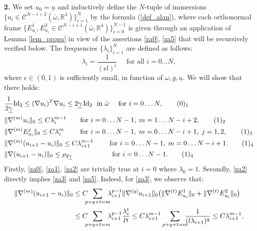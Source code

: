 \documentclass[reqno,twoside,11pt]{amsart}
\newcommand{\Id}{\mathrm{Id}}
\newcommand{\R}{\mathbb{R}}
\numberwithin{equation}{section}
\theoremstyle{plain}
\theoremstyle{definition}
\begin{document}
{\bf 2.} We set $u_0=\underline u$ and  inductively define the $N$-tuple of
immersions $\{u_i\in\mathcal{C}^{N-i+2}(\bar\omega, \R^4)\}_{i=1}^N$
by the formula (\ref{def_alan}), where each orthonormal frame $\{E^1_{u_i},
E^2_{u_i}\in\mathcal{C}^{N-i+1}(\bar\omega, \R^4)\}_{i=0}^{N-1}$ is
given through an application of Lemma \ref{lem_propa} in view of the
assertions \ref{za0}, \ref{za5} that will be recursively verified
below. The frequencies $\{\lambda_i\}_{i=1}^N$ are defined as follows:
\begin{equation}\label{b2}
\lambda_i = \frac{1}{(\epsilon l)^i} \quad \mbox{ for all } i=0\ldots N, 
\end{equation}
where $\epsilon\in (0,1)$ is sufficiently small, in function of $\omega, g, \underline u$.
We will show that there holds:
\begin{align*}
& \frac{1}{2\underline\gamma}\Id_2\leq (\nabla u_i)^T\nabla 
u_i\leq 2\underline \gamma \,\Id_2
\; \mbox{ in } \bar\omega\quad \mbox{ for  } i=0\ldots N,
\tag*{(\theequation)$_1$}\refstepcounter{equation} \label{za0} \\
& \|\nabla^{(m)}u_i\|_0\leq C\lambda_i^{m-1}\quad 
\quad \mbox{for } i=0\ldots N-1,\; m=1\ldots N-i+2, \tag*{(\theequation)$_2$} \label{za1}\\
& \|\nabla^{(m)}E_{u_i}^j\|_0\leq C\lambda_i^{m}\quad 
\quad \mbox{ for } i=0\ldots N-1,\; m=0\ldots N-i+1,\; j=1,2, \tag*{(\theequation)$_3$} \label{za2}\\
& \|\nabla^{(m)}(u_{i+1}-u_i)\|_0\leq C\lambda_{i+1}^{m-1}\qquad 
\mbox{ for } i=0\ldots N-1,\; m=0\ldots N-i+1. \tag*{(\theequation)$_4$} \label{za3}\\
& \|\nabla(u_{i+1}-u_i)\|_0\leq \rho_{2\underline\gamma}\hspace{2.05cm}
\mbox{for } i=0\ldots N-1.\tag*{(\theequation)$_4$} \label{za5}
\end{align*}
Firstly, \ref{za0}, \ref{za1}, \ref{za2} are trivially true at $i=0$ where
$\lambda_0=1$. Secondly, \ref{za2} directly implies \ref{za3} and
\ref{za5}. Indeed, for \ref{za3}, we observe that:
\begin{equation*}
\begin{split}
\|\nabla^{(m)}(u_{i+1}-u_i)\|_0 &\leq C \hspace{-2mm}\sum_{p+q+t=m}
\hspace{-2mm} \lambda_{i+1}^{p-1}\|\nabla^{(q)}a_{i+1}\|_0
\big(\|\nabla^{(t)}E_{u_i}^1\|_0+\|\nabla^{(t)}E_{u_i}^2\|_0\big) 
\\ & \leq C \hspace{-2mm}\sum_{p+q+t=m}
\hspace{-2mm} \lambda_{i+1}^{p-1}\frac{\lambda_i^t}{l^q}
\leq  C\lambda_{i+1}^{m-1} \sum_{p+q+t=m}
\hspace{-2mm} \frac{1}{(l\lambda_{i+1})^{q}}\leq C\lambda_{i+1}^{m-1}, 
\end{split}
\end{equation*}
\end{document}
